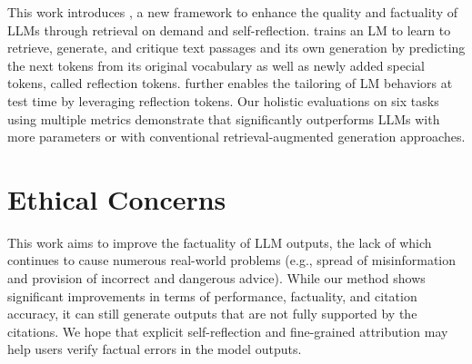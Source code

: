 This work introduces \model, a new framework to enhance the quality and factuality of LLMs through retrieval on demand and self-reflection. 
\model trains an LM to learn to retrieve, generate, and critique text passages and its own generation by predicting the next tokens from its original vocabulary as well as newly added special tokens, called reflection tokens. 
\model further enables the tailoring of LM behaviors at test time by leveraging reflection tokens. 
Our holistic evaluations on six tasks using multiple metrics demonstrate that \model significantly outperforms LLMs with more parameters or with conventional retrieval-augmented generation approaches. 

\section*{Ethical Concerns}
This work aims to improve the factuality of LLM outputs, the lack of which continues to cause numerous real-world problems (e.g., spread of misinformation and provision of incorrect and dangerous advice). While our method shows significant improvements in terms of performance, factuality, and citation accuracy, it can still generate outputs that are not fully supported by the citations. 
We hope that explicit self-reflection and fine-grained attribution may help users verify factual errors in the model outputs. 
